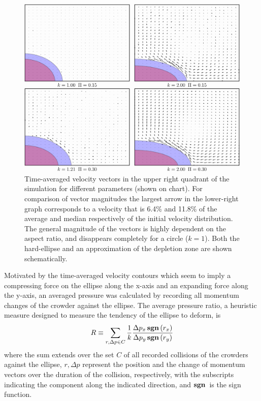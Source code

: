 \begin{figure}
\includegraphics[width=15cm]{entropic_flow_paper/FIG3_fourvelocity.jpg}
\caption{Time-averaged velocity vectors in the upper right quadrant of the simulation for different parameters (shown on chart). For comparison of vector magnitudes the largest arrow in the lower-right graph corresponds to a velocity that is 6.4\% and 11.8\% of the average and median respectively of the initial velocity distribution. The general magnitude of the vectors is highly dependent on the aspect ratio, and disappears completely for a circle ($k=1$). Both the hard-ellipse and an approximation of the depletion zone are shown schematically. }
\label{fig:velocity_plot}
\end{figure}

Motivated by the time-averaged velocity contours which seem to imply a compressing force on the ellipse along the x-axis and an expanding force along the y-axis, an averaged pressure was calculated by recording all momentum changes of the crowder against the ellipse. The average pressure ratio, a heuristic measure designed to measure the tendency of the ellipse to deform, is
%
\begin{equation}
R \equiv \sum_{r,\Delta p \in C}{ \frac{1}{k} \frac{{ \Delta p_x \operatorname*{\mathbf{sgn}\,}(r_x) }}{{\Delta p_y \operatorname*{\mathbf{sgn}\,}(r_y) } } }
\end{equation}
%
where the sum extends over the set $C$ of all recorded collisions of the crowders against the ellipse, $r,\Delta p$ represent the  position and the change of momentum vectors over the duration of the collision, respectively, with the subscripts indicating the component along the indicated direction, and $\operatorname*{\mathbf{sgn}\,}$ is the sign function.


